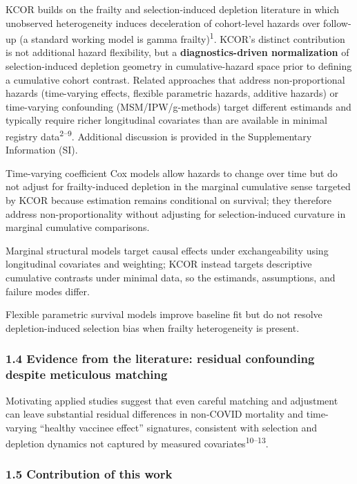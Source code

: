 \documentclass[
]{article}
\begin{document}
KCOR builds on the frailty and selection-induced depletion literature in which unobserved heterogeneity induces deceleration of cohort-level hazards over follow-up (a standard working model is gamma frailty)\textsuperscript{1}. KCOR's distinct contribution is not additional hazard flexibility, but a \textbf{diagnostics-driven normalization} of selection-induced depletion geometry in cumulative-hazard space prior to defining a cumulative cohort contrast. Related approaches that address non-proportional hazards (time-varying effects, flexible parametric hazards, additive hazards) or time-varying confounding (MSM/IPW/g-methods) target different estimands and typically require richer longitudinal covariates than are available in minimal registry data\textsuperscript{2--9}. Additional discussion is provided in the Supplementary Information (SI).

Time-varying coefficient Cox models allow hazards to change over time but do not adjust for frailty-induced depletion in the marginal cumulative sense targeted by KCOR because estimation remains conditional on survival; they therefore address non-proportionality without adjusting for selection-induced curvature in marginal cumulative comparisons.

Marginal structural models target causal effects under exchangeability using longitudinal covariates and weighting; KCOR instead targets descriptive cumulative contrasts under minimal data, so the estimands, assumptions, and failure modes differ.

Flexible parametric survival models improve baseline fit but do not resolve depletion-induced selection bias when frailty heterogeneity is present.

\subsubsection{1.4 Evidence from the literature: residual confounding despite meticulous matching}\label{evidence-from-the-literature-residual-confounding-despite-meticulous-matching}

Motivating applied studies suggest that even careful matching and adjustment can leave substantial residual differences in non-COVID mortality and time-varying ``healthy vaccinee effect'' signatures, consistent with selection and depletion dynamics not captured by measured covariates\textsuperscript{10--13}.

\subsubsection{1.5 Contribution of this work}\label{contribution-of-this-work}
\end{document}
